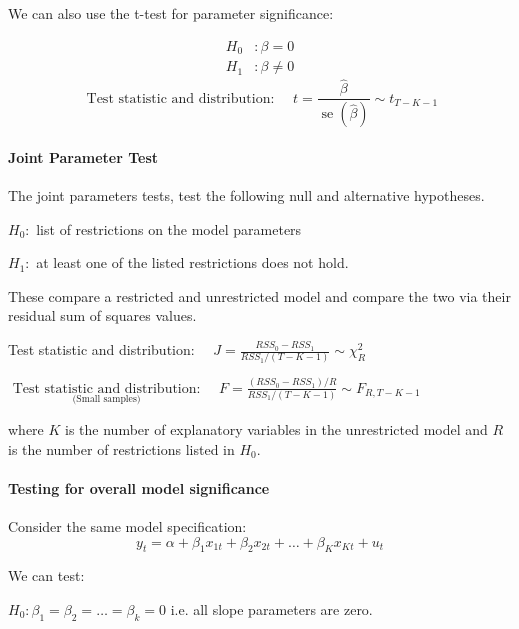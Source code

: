 \documentclass[11pt]{article}
\begin{document}
We can also use the t-test for parameter significance:
\begin{mdframed}
    \begin{align*}
        H_0&: \beta = 0 \\
        H_1&: \beta \neq 0
    \end{align*}
    \begin{equation}
\text { Test statistic and distribution: } \quad t=\frac{\hat{\beta}}{\operatorname{se}(\hat{\beta})} \sim t_{T-K-1}
\end{equation}
\end{mdframed}

\paragraph{Joint Parameter Test} \mbox{}

The joint parameters tests, test the following null and alternative hypotheses.

$H_0:$ list of restrictions on the model parameters

$H_1:$ at least one of the listed restrictions does not hold.

These compare a restricted and unrestricted model and compare the two via their residual sum of squares values.

\begin{mdframed}
Test statistic and distribution: $\quad J=\frac{R S S_0-R S S_1}{R S S_1 /(T-K-1)} \sim \chi_R^2$
    
$\underset{\text { (Small samples) }}{\text { Test statistic and distribution: }} \quad F=\frac{\left(R S S_0-R S S_1\right) / R}{R S S_1 /(T-K-1)} \sim F_{R, T-K-1}$

where $K$ is the number of explanatory variables in the unrestricted model and $R$ is the number of restrictions listed in $H_0$.
\end{mdframed}

\paragraph{Testing for overall model significance} \mbox{}

Consider the same model specification:
\begin{equation}
y_t=\alpha+\beta_1 x_{1 t}+\beta_2 x_{2 t}+\ldots+\beta_K x_{K t}+u_t
\end{equation}

We can test:

$H_0: \beta_1 = \beta_2 = \ldots = \beta_k = 0$ i.e. all slope parameters are zero.
\end{document}
